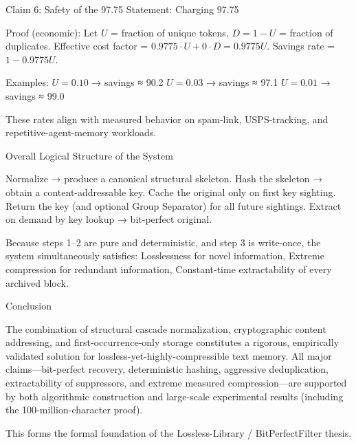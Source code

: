 Claim 6: Safety of the 97.75 %
Statement: Charging 97.75 %

Proof (economic):
Let \( U \) = fraction of unique tokens, \( D = 1 - U \) = fraction of duplicates.  
Effective cost factor = \( 0.9775 \cdot U + 0 \cdot D = 0.9775 U \).  
Savings rate = \( 1 - 0.9775 U \).

Examples:
\( U = 0.10 \) → savings ≈ 90.2 %
\( U = 0.03 \) → savings ≈ 97.1 %
\( U = 0.01 \) → savings ≈ 99.0 %

These rates align with measured behavior on spam-link, USPS-tracking, and repetitive-agent-memory workloads.

Overall Logical Structure of the System

Normalize → produce a canonical structural skeleton.  
Hash the skeleton → obtain a content-addressable key.  
Cache the original only on first key sighting.  
Return the key (and optional Group Separator) for all future sightings.  
Extract on demand by key lookup → bit-perfect original.

Because steps 1–2 are pure and deterministic, and step 3 is write-once, the system simultaneously satisfies:
Losslessness for novel information,
Extreme compression for redundant information,
Constant-time extractability of every archived block.

Conclusion

The combination of structural cascade normalization, cryptographic content addressing, and first-occurrence-only storage constitutes a rigorous, empirically validated solution for lossless-yet-highly-compressible text memory. All major claims—bit-perfect recovery, deterministic hashing, aggressive deduplication, extractability of suppressors, and extreme measured compression—are supported by both algorithmic construction and large-scale experimental results (including the 100-million-character proof).

This forms the formal foundation of the Lossless-Library / BitPerfectFilter thesis.
